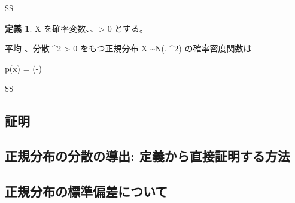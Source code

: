 \documentclass[
  11pt,
  a4paper,
]{extarticle}
\numberwithin{equation}{section}
\theoremstyle{plain}
\theoremstyle{definition}
\newtheorem{dfn}{定義}
\begin{document}
\$\$

\begin{dfn}

X を確率変数、\mu \in {}、\sigma > 0 とする。

平均 \mu \in {}、分散 \sigma^2 > 0 をもつ正規分布 X \sim N(\mu, \sigma^2) の確率密度関数は

p(x) =  \exp\left(-\right)

\end{dfn}

\$\$

\subsection{証明}\label{ux8a3cux660e}

\subsection{正規分布の分散の導出:
定義から直接証明する方法}\label{ux6b63ux898fux5206ux5e03ux306eux5206ux6563ux306eux5c0eux51fa-ux5b9aux7fa9ux304bux3089ux76f4ux63a5ux8a3cux660eux3059ux308bux65b9ux6cd5}

\subsection{正規分布の標準偏差について}\label{ux6b63ux898fux5206ux5e03ux306eux6a19ux6e96ux504fux5deeux306bux3064ux3044ux3066}
\end{document}
